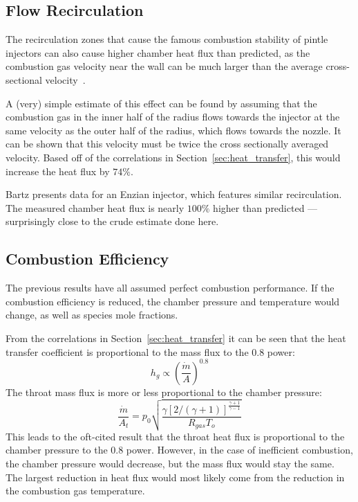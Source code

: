 \documentclass[11pt]{article}
\begin{document}
\subsection{Flow Recirculation}

The recirculation zones that cause the famous combustion stability of pintle injectors can also cause higher chamber heat flux than predicted, as the combustion gas velocity near the wall can be much larger than the average cross-sectional velocity~\cite[Page 81]{bartz_turbulent_1965}.

A (very) simple estimate of this effect can be found by assuming that the combustion gas in the inner half of the radius flows towards the injector at the same velocity as the outer half of the radius, which flows towards the nozzle. It can be shown that this velocity must be twice the cross sectionally averaged velocity. Based off of the correlations in Section~\ref{sec:heat_transfer}, this would increase the heat flux by $74\%$.

Bartz presents data for an Enzian injector, which features similar recirculation. The measured chamber heat flux is nearly $100\%$ higher than predicted --- surprisingly close to the crude estimate done here.

\subsection{Combustion Efficiency}
The previous results have all assumed perfect combustion performance. If the combustion efficiency is reduced, the chamber pressure and temperature would change, as well as species mole fractions.

From the correlations in Section~\ref{sec:heat_transfer} it can be seen that the heat transfer coefficient is proportional to the mass flux to the 0.8 power:
\begin{equation}
  h_g \propto \left(\frac{\dot{m}}{A}\right)^{0.8}
\end{equation}
The throat mass flux is more or less proportional to the chamber pressure:
\begin{equation}
  \frac{\dot{m}}{A_t}  = p_0 \sqrt{\frac{\gamma [2 / (\gamma + 1)]^{\frac{\gamma + 1}{\gamma - 1}}}{R_{gas} T_o}}
\end{equation}
This leads to the oft-cited result that the throat heat flux is proportional to the chamber pressure to the 0.8 power. However, in the case of inefficient combustion, the chamber pressure would decrease, but the mass flux would stay the same. The largest reduction in heat flux would most likely come from the reduction in the combustion gas temperature.
\end{document}

